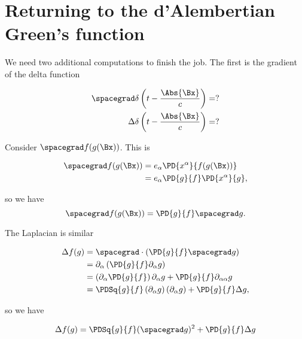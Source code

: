 \section{Returning to the d'Alembertian Green's function}

We need two additional computations to finish the job.  The first is the gradient of the delta function

\begin{equation}\label{eqn:relativisticElectrodynamicsL18:840}
\begin{aligned}
\spacegrad \delta\left(t - \frac{\Abs{\Bx}}{c}\right) &= ? \\
\Delta \delta\left(t - \frac{\Abs{\Bx}}{c}\right) &= ?
\end{aligned}
\end{equation}

Consider \(\spacegrad f(g(\Bx))\).  This is

\begin{equation}\label{eqn:relativisticElectrodynamicsL18:860}
\begin{aligned}
\spacegrad f(g(\Bx))
&=
e_\alpha \PD{x^\alpha}{f(g(\Bx))} \\
&=
e_\alpha \PD{g}{f} \PD{x^\alpha}{g},
\end{aligned}
\end{equation}

so we have
\begin{equation}\label{eqn:relativisticElectrodynamicsL18:400}
\spacegrad f(g(\Bx))
=
\PD{g}{f} \spacegrad g.
\end{equation}

The Laplacian is similar

\begin{equation}\label{eqn:relativisticElectrodynamicsL18:880}
\begin{aligned}
\Delta f(g)
&= 
\spacegrad \cdot \left(\PD{g}{f} \spacegrad g \right) \\
&= 
\partial_\alpha \left(\PD{g}{f} \partial_\alpha g \right) \\
&= 
\left( \partial_\alpha \PD{g}{f} \right) \partial_\alpha g 
+\PD{g}{f} \partial_{\alpha\alpha} g  \\
&= 
\PDSq{g}{f} \left( \partial_\alpha g \right) (\partial_\alpha g)
+\PD{g}{f} \Delta g,
\end{aligned}
\end{equation}

so we have

\begin{equation}\label{eqn:relativisticElectrodynamicsL18:420}
\Delta f(g)
= 
\PDSq{g}{f} (\spacegrad g)^2 +\PD{g}{f} \Delta g
\end{equation}

